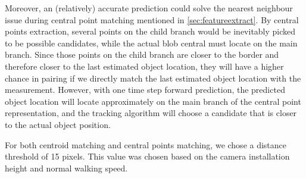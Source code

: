 Moreover, an (relatively) accurate prediction could solve the nearest neighbour issue during central point matching mentioned in \autoref{sec:featureextract}. By central points extraction, several points on the child branch would be inevitably picked to be possible candidates, while the actual blob central must locate on the main branch. Since those points on the child branch are closer to the border and therefore closer to the last estimated object location, they will have a higher chance in pairing if we directly match the last estimated object location with the measurement. However, with one time step forward prediction, the predicted object location will locate approximately on the main branch of the central point representation, and the tracking algorithm will choose a candidate that is closer to the actual object position.

For both centroid matching and central points matching, we chose a distance threshold of 15 pixels. This value was chosen based on the camera installation height and normal walking speed.

